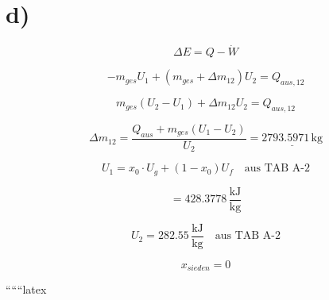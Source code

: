

\section*{d)}

\[
\Delta E = Q - \dot{W}
\]

\[
-m_{ges} U_1 + (m_{ges} + \Delta m_{12}) U_2 = Q_{aus, 12}
\]

\[
m_{ges} (U_2 - U_1) + \Delta m_{12} U_2 = Q_{aus, 12}
\]

\[
\Delta m_{12} = \frac{Q_{aus} + m_{ges} (U_1 - U_2)}{U_2} = \underline{2793.5971 \, \text{kg}}
\]

\[
U_1 = x_0 \cdot U_g + (1 - x_0) U_f \quad \text{aus TAB A-2}
\]

\[
= 428.3778 \, \frac{\text{kJ}}{\text{kg}}
\]

\[
U_2 = 282.55 \, \frac{\text{kJ}}{\text{kg}} \quad \text{aus TAB A-2}
\]

\[
x_{sieden} = 0
\]

``````latex